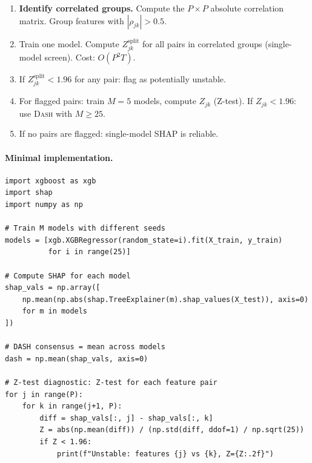 \documentclass{article}
\newcommand{\DASH}{\textsc{Dash}}
\begin{document}
\begin{enumerate}
    \item[\textbf{Step 0.}] \textbf{Identify correlated groups.} Compute the $P \times P$ absolute correlation matrix. Group features with $|\rho_{jk}| > 0.5$.
    \item[\textbf{Step 1.}] Train one model. Compute $Z^{\text{split}}_{jk}$ for all pairs in correlated groups (single-model screen). Cost: $O(P^2 T)$.
    \item[\textbf{Step 2.}] If $Z^{\text{split}}_{jk} < 1.96$ for any pair: flag as potentially unstable.
    \item[\textbf{Step 3.}] For flagged pairs: train $M = 5$ models, compute $Z_{jk}$ (Z-test). If $Z_{jk} < 1.96$: use \DASH{} with $M \geq 25$.
    \item[\textbf{Step 4.}] If no pairs are flagged: single-model SHAP is reliable.
\end{enumerate}

\paragraph{Minimal implementation.}
\begin{verbatim}
import xgboost as xgb
import shap
import numpy as np

# Train M models with different seeds
models = [xgb.XGBRegressor(random_state=i).fit(X_train, y_train)
          for i in range(25)]

# Compute SHAP for each model
shap_vals = np.array([
    np.mean(np.abs(shap.TreeExplainer(m).shap_values(X_test)), axis=0)
    for m in models
])

# DASH consensus = mean across models
dash = np.mean(shap_vals, axis=0)

# Z-test diagnostic: Z-test for each feature pair
for j in range(P):
    for k in range(j+1, P):
        diff = shap_vals[:, j] - shap_vals[:, k]
        Z = abs(np.mean(diff)) / (np.std(diff, ddof=1) / np.sqrt(25))
        if Z < 1.96:
            print(f"Unstable: features {j} vs {k}, Z={Z:.2f}")
\end{verbatim}
\end{document}
